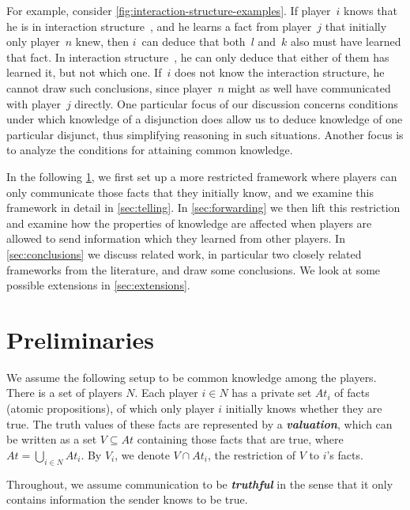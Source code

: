 \documentclass{article}
\newcounter{#1}
\newcommand{\dfn}[1]{\emph{\bfseries #1}}
\newcommand{\bits}{\ensuremath{At}\xspace}
\begin{document}
For example, consider \cref{fig:interaction-structure-examples}.
If player~$i$ knows that he is in interaction structure~,
and he learns a fact from player~$j$ that initially only player~$n$ knew,
then $i$~can deduce that both~$l$ and~$k$ also must have learned that fact.
In interaction structure~,
he can only deduce that either of them has learned it, but not which one.
If~$i$ does not know the interaction structure,
he cannot draw such conclusions, since player~$n$ might as well have communicated with player~$j$ directly.
One particular focus of our discussion concerns conditions under which knowledge of a disjunction
does allow us to deduce knowledge of one particular disjunct,
thus simplifying reasoning in such situations.
Another focus is to analyze the conditions for attaining common knowledge.

In the following \cref{sec:defs}, we first set up a more restricted framework
where players can only communicate those facts that they initially know,
and we examine this framework in detail in \cref{sec:telling}.
In \cref{sec:forwarding} we then lift this restriction
and examine how the properties of knowledge are affected
when players are allowed to send information which they learned from other players.
In \cref{sec:conclusions} we discuss related work,
in particular two closely related frameworks from the literature,
and draw some conclusions.
We look at some possible extensions in \cref{sec:extensions}.

\section{Preliminaries}
\label{sec:defs}

We assume the following setup to be common knowledge among the players.
There is a set of players $N$.  Each player $i \in N$ has
a private set $\bits_i$ of facts (atomic propositions), of which only player $i$ initially knows whether they are true.
The truth values of these facts are represented by a \dfn{valuation},
which can be written as a set $V \subseteq \bits$ containing those facts that are true,
where $\bits=\bigcup_{i\in N}\bits_i$.
By $V_i$, we denote $V\cap \bits_i$, the restriction of $V$ to $i$'s facts. 



Throughout, we assume communication to be \dfn{truthful} in the sense that it only contains information the sender knows to be true.
\end{document}
